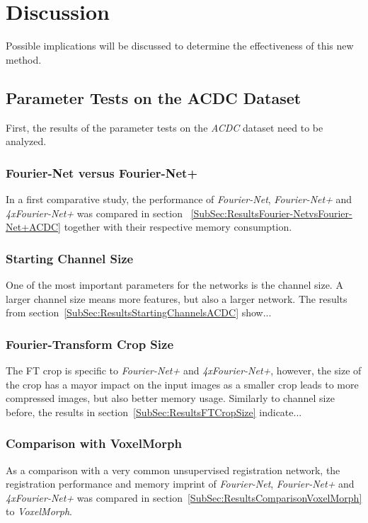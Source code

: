 
\chapter{Discussion} \label{Ch:Discussion}
Possible implications will be discussed to determine the effectiveness of this new method.

\section{Parameter Tests on the ACDC Dataset} \label{Sec:DiscussionParameterTestsACDC}
First, the results of the parameter tests on the \emph{ACDC} dataset need to be analyzed.

\subsection{Fourier-Net versus Fourier-Net+} \label{SubSec:DiscussionFourier-NetvsFourier-Net+ACDC}
In a first comparative study, the performance of \emph{Fourier-Net}, \emph{Fourier-Net+} and \emph{4xFourier-Net+} was compared in section ~\ref{SubSec:ResultsFourier-NetvsFourier-Net+ACDC} together with their respective memory consumption.

\subsection{Starting Channel Size} \label{SubSec:DiscussionStartingChannelsACDC}
One of the most important parameters for the networks is the channel size. A larger channel size means more features, but also a larger network. The results from section~\ref{SubSec:ResultsStartingChannelsACDC} show...

\subsection{Fourier-Transform Crop Size} \label{SubSec:DiscussionFTCropSize}
The FT crop is specific to \emph{Fourier-Net+} and \emph{4xFourier-Net+}, however, the size of the crop has a mayor impact on the input images as a smaller crop leads to more compressed images, but also better memory usage. Similarly to channel size before, the results in section~\ref{SubSec:ResultsFTCropSize} indicate...

\subsection{Comparison with VoxelMorph} \label{SubSec:DiscussionComparisonVoxelMorph}
As a comparison with a very common unsupervised registration network, the registration performance and memory imprint of \emph{Fourier-Net}, \emph{Fourier-Net+} and \emph{4xFourier-Net+} was compared in section~\ref{SubSec:ResultsComparisonVoxelMorph} to \emph{VoxelMorph}.

